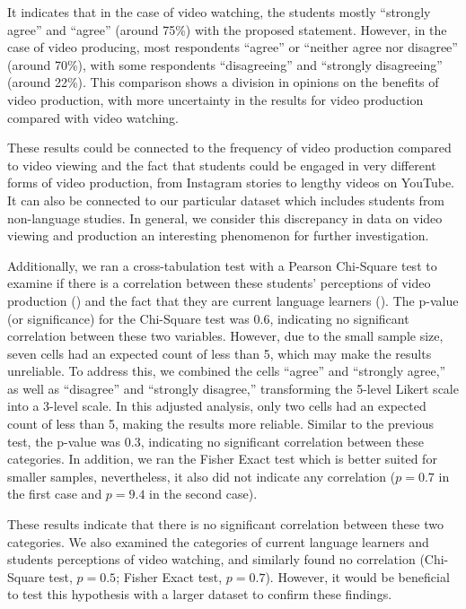 It indicates that in the case of video watching, the students mostly
``strongly agree'' and ``agree'' (around 75\%) with the proposed
statement. However, in the case of video producing, most respondents
``agree'' or ``neither agree nor disagree'' (around 70\%), with some
respondents ``disagreeing'' and ``strongly disagreeing'' (around 22\%).
This comparison shows a division in opinions on the benefits of video
production, with more uncertainty in the results for video production
compared with video watching.

These results could be connected to the frequency of video production
compared to video viewing and the fact that students could be engaged in
very different forms of video production, from Instagram stories to
lengthy videos on YouTube. It can also be connected to our particular
dataset which includes students from non-language studies. In general,
we consider this discrepancy in data on video viewing and production an
interesting phenomenon for further investigation.

Additionally, we ran a cross-tabulation test with a Pearson Chi-Square
test to examine if there is a correlation between these students'
perceptions of video production () and the fact that they are
current language learners (). The p-value (or significance) for
the Chi-Square test was 0.6, indicating no significant correlation
between these two variables. However, due to the small sample size,
seven cells had an expected count of less than 5, which may make the
results unreliable. To address this, we combined the cells ``agree'' and
``strongly agree,'' as well as ``disagree'' and ``strongly disagree,''
transforming the 5-level Likert scale into a 3-level scale. In this
adjusted analysis, only two cells had an expected count of less than 5,
making the results more reliable. Similar to the previous test, the
p-value was 0.3, indicating no significant correlation between these
categories. In addition, we ran the Fisher Exact test which is better
suited for smaller samples, nevertheless, it also did not indicate any
correlation ($p=0.7$ in the first case and $p=9.4$ in the second case).

These results indicate that there is no significant correlation between
these two categories. We also examined the categories of current
language learners and students\textquotesingle{} perceptions of video
watching, and similarly found no correlation (Chi-Square test, $p=0.5$;
Fisher Exact test, $p=0.7$). However, it would be beneficial to test this
hypothesis with a larger dataset to confirm these findings.


